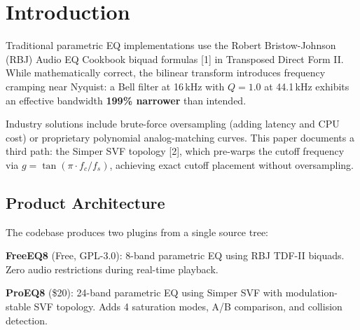 \documentclass[twoside,a4paper]{article}
\title{\papertitle}
\affiliation{\paperauthorA}{Independent Researcher (GareBear99 / TizWildin) \\ \url{https://github.com/GareBear99/FreeEQ8}\\{\tt gdoman99@gmail.com}}
\begin{document}
\ifpdf{}\else{}\fi
\maketitle

\begin{abstract}
We present FreeEQ8/ProEQ8, an open-source parametric equalizer using the Simper State Variable Filter (SVF) topology for modulation-stable Dynamic EQ. Both SVF and RBJ use BLT with identical prewarping and produce identical steady-state responses; SVF chosen for lower automation noise, better coefficient interpolation, improved SNR near DC. The architecture features lock-free SPSC triple-buffering for real-time safety, a variable-cadence coefficient engine reducing Dynamic EQ CPU cost by 75\%, and allocation-free semantic resonance detection. Measured performance: 0.62\% single-core CPU at 44.1\,kHz (161$\times$ headroom). Source code, benchmarks, and CI validation available under GPL-3.0.
\end{abstract}

\section{Introduction}
Traditional parametric EQ implementations use the Robert Bristow-Johnson (RBJ) Audio EQ Cookbook biquad formulas [1] in Transposed Direct Form II. While mathematically correct, the bilinear transform introduces frequency cramping near Nyquist: a Bell filter at 16\,kHz with $Q=1.0$ at 44.1\,kHz exhibits an effective bandwidth \textbf{199\% narrower} than intended.

Industry solutions include brute-force oversampling (adding latency and CPU cost) or proprietary polynomial analog-matching curves. This paper documents a third path: the Simper SVF topology [2], which pre-warps the cutoff frequency via $g = \tan(\pi \cdot f_c / f_s)$, achieving exact cutoff placement without oversampling.

\subsection{Product Architecture}
The codebase produces two plugins from a single source tree:

\textbf{FreeEQ8} (Free, GPL-3.0): 8-band parametric EQ using RBJ TDF-II biquads. Zero audio restrictions during real-time playback.

\textbf{ProEQ8} (\$20): 24-band parametric EQ using Simper SVF with modulation-stable SVF topology. Adds 4 saturation modes, A/B comparison, and collision detection.
\end{document}
